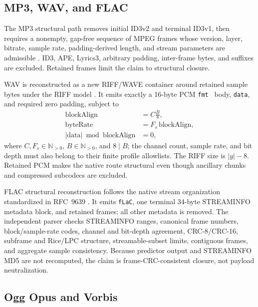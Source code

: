 \subsection{MP3, WAV, and FLAC}\label{subsec:native-audio-method}

The MP3 structural path removes initial ID3v2 and terminal ID3v1, then requires
a nonempty, gap-free sequence of MPEG frames whose version, layer, bitrate,
sample rate, padding-derived length, and stream parameters are admissible
\cite{iso11172}. ID3, APE, Lyrics3, arbitrary padding, inter-frame bytes, and
suffixes are excluded. Retained frames limit the claim to structural closure.

WAV is reconstructed as a new RIFF/WAVE container around retained sample
bytes under the RIFF model \cite{microsoftRiff}. It emits exactly a 16-byte PCM
\texttt{fmt } body, \texttt{data}, and required zero padding, subject to
\begin{equation}
\begin{aligned}
\mathrm{blockAlign}&=C\frac{B}{8},\\
\mathrm{byteRate}&=F_s\,\mathrm{blockAlign},\\
\lvert\mathrm{data}\rvert\bmod\mathrm{blockAlign}&=0,
\end{aligned}
\label{eq:wav-integrity}
\end{equation}
where \(C,F_s\in\mathbb N_{>0}\), \(B\in\mathbb N_{>0}\), and \(8\mid B\);
the channel count, sample rate, and bit depth must also belong to their finite
profile allowlists.
The RIFF size is \(|y|-8\). Retained PCM makes the native route structural even
though ancillary chunks and compressed subcodecs are excluded.

FLAC structural reconstruction follows the native stream organization
standardized in RFC~9639 \cite{rfc9639}. It emits \texttt{fLaC}, one terminal
34-byte STREAMINFO metadata block, and retained frames; all other metadata is
removed. The independent parser checks STREAMINFO ranges, canonical frame
numbers, block/sample-rate codes, channel and bit-depth agreement, CRC-8/CRC-16,
subframe and Rice/LPC structure, streamable-subset limits, contiguous frames,
and aggregate sample consistency. Because predictor output and STREAMINFO MD5
are not recomputed, the claim is frame-CRC-consistent closure, not payload
neutralization.

\subsection{Ogg Opus and Vorbis}\label{subsec:ogg-method}

